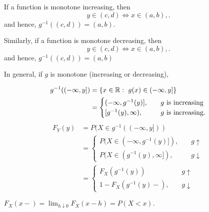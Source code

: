 \begin{remark}
If a function is monotone increasing, then
\[
y\in(c,d)\iff x\in (a,b),
.\] 
and hence, $g^{-1}((c,d))=(a,b).$



Similarly, if a function is monotone decreasing, then
\[
y\in (c,d) \iff x\in (a,b),
.\] 
and hence, $g^{-1}((c,d))= (a,b)$


In general, if $g$ is monotone (increasing or decreasing),

\begin{align*}
    g^{-1}((-\infty,y])
    &=\{x\in \mathbb R: \ g(x)\in(-\infty,y]\} \\
    &=\begin{cases}
    (-\infty,g^{-1}(y)], \quad &g \text{ is increasing}\\
    [g^{-1}(y),\infty), \quad &g \text{ is increasing}.
    \end{cases}
\end{align*}
\begin{align*}
    F_Y(y)&=P(X\in g^{-1}((-\infty,y])) \\
    &=\begin{cases}
    P(X\in (-\infty,g^{-1}(y)]), \quad & g \uparrow \\
    P(X\in (g^{-1}(y),\infty]), \quad & g \downarrow 
    \end{cases} \\
    &=\begin{cases}
    F_X(g^{-1}(y)) \quad  & g \uparrow \\
    1-F_X(g^{-1}(y)-), \quad & g \downarrow 
    \end{cases}
\end{align*}
\end{remark}
\begin{note}
$F_X(x-)=\lim_{h\downarrow 0}F_X(x-h)=P(X<x).$
\end{note}

